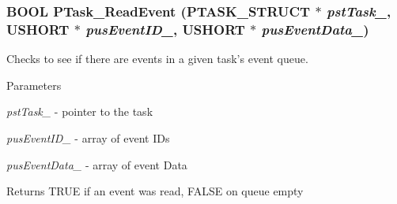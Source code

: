 \subsubsection[{PTask\_\-ReadEvent}]{\setlength{\rightskip}{0pt plus 5cm}BOOL PTask\_\-ReadEvent ({\bf PTASK\_\-STRUCT} $\ast$ {\em pstTask\_\-}, \/  USHORT $\ast$ {\em pusEventID\_\-}, \/  USHORT $\ast$ {\em pusEventData\_\-})}\label{ptask_8c_a6771d6c40157f14e1b583749f63c4ce5}
Checks to see if there are events in a given task's event queue.


\begin{DoxyParams}{Parameters}
\item[{\em pstTask\_\-}]-\/ pointer to the task \item[{\em pusEventID\_\-}]-\/ array of event IDs \item[{\em pusEventData\_\-}]-\/ array of event Data \end{DoxyParams}
\begin{DoxyReturn}{Returns}
TRUE if an event was read, FALSE on queue empty 
\end{DoxyReturn}
